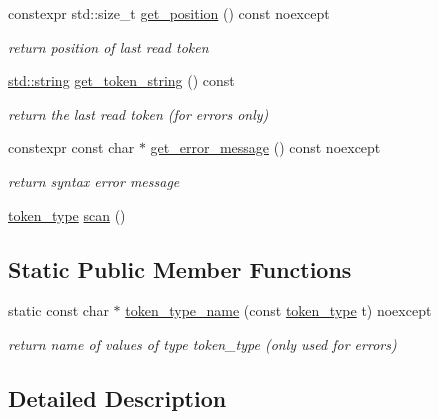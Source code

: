 \begin{DoxyCompactItemize}
constexpr std\+::size\+\_\+t \hyperlink{classnlohmann_1_1detail_1_1lexer_a2a00465a3d5d70c84809cdb27658db79}{get\+\_\+position} () const noexcept
\begin{DoxyCompactList}\small\item\em return position of last read token \end{DoxyCompactList}\item 
\hyperlink{namespacenlohmann_1_1detail_a90aa5ef615aa8305e9ea20d8a947980fab45cffe084dd3d20d928bee85e7b0f21}{std\+::string} \hyperlink{classnlohmann_1_1detail_1_1lexer_a6d8a58be845717a86726756372414cbb}{get\+\_\+token\+\_\+string} () const 
\begin{DoxyCompactList}\small\item\em return the last read token (for errors only) \end{DoxyCompactList}\item 
constexpr const char $\ast$ \hyperlink{classnlohmann_1_1detail_1_1lexer_a53cebbc684ef97fa49651eb442d58f86}{get\+\_\+error\+\_\+message} () const noexcept
\begin{DoxyCompactList}\small\item\em return syntax error message \end{DoxyCompactList}\item 
\hyperlink{classnlohmann_1_1detail_1_1lexer_a3f313cdbe187cababfc5e06f0b69b098}{token\+\_\+type} \hyperlink{classnlohmann_1_1detail_1_1lexer_aac3041cd2b9291e64fee38db422863c9}{scan} ()
\end{DoxyCompactItemize}
\subsection*{Static Public Member Functions}
\begin{DoxyCompactItemize}
\item 
static const char $\ast$ \hyperlink{classnlohmann_1_1detail_1_1lexer_ae514e2005f0ce185f1ad366139e541e8}{token\+\_\+type\+\_\+name} (const \hyperlink{classnlohmann_1_1detail_1_1lexer_a3f313cdbe187cababfc5e06f0b69b098}{token\+\_\+type} t) noexcept
\begin{DoxyCompactList}\small\item\em return name of values of type token\+\_\+type (only used for errors) \end{DoxyCompactList}\end{DoxyCompactItemize}


\subsection{Detailed Description}
